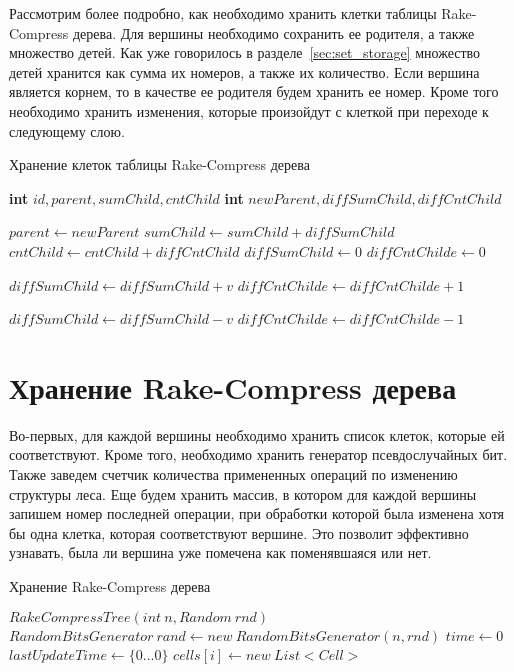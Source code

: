 Рассмотрим более подробно, как необходимо хранить клетки таблицы Rake-Compress дерева. 
Для вершины необходимо сохранить ее родителя, а также множество детей. 
Как уже говорилось в разделе~\ref{sec:set_storage} множество детей хранится как сумма их номеров, а также их количество.
Если вершина является корнем, то в качестве ее родителя будем хранить ее номер.
Кроме того необходимо хранить изменения, которые произойдут с клеткой при переходе к следующему слою.

\FloatBarrier
\begin{algorithm}
\caption{Хранение клеток таблицы Rake-Compress дерева}\label{algo:cell}
\begin{algorithmic}[1]
\State \textbf{int} $id, parent, sumChild, cntChild$
\State \textbf{int} $newParent, diffSumChild, diffCntChild$

\Statex
{}
	\State $parent \gets newParent$
	\State $sumChild \gets sumChild + diffSumChild$
	\State $cntChild \gets cntChild + diffCntChild$
	\State $diffSumChild \gets 0$
	\State $diffCntChilde \gets 0$
\EndProcedure

\Statex
{}
	\State $diffSumChild \gets diffSumChild + v$
	\State $diffCntChilde \gets diffCntChilde + 1$
\EndProcedure

\Statex
{}
	\State $diffSumChild \gets diffSumChild - v$
	\State $diffCntChilde \gets diffCntChilde - 1$
\EndProcedure

\end{algorithmic}
\end{algorithm}

\FloatBarrier
\section{Хранение Rake-Compress дерева}   

Во-первых, для каждой вершины необходимо хранить список клеток, которые ей соответствуют. 
Кроме того, необходимо хранить генератор псевдослучайных бит. 
Также заведем счетчик количества примененных операций по изменению структуры леса.
Еще будем хранить массив, в котором для каждой вершины запишем номер последней операции, 
при обработки которой была изменена хотя бы одна клетка, которая соответствуют вершине.
Это позволит эффективно узнавать, была ли вершина уже помечена как поменявшаяся или нет.

\FloatBarrier
\begin{algorithm}
\caption{Хранение Rake-Compress дерева}\label{algo:rc_tree_storage}
\begin{algorithmic}[1]
\State $RakeCompressTree(int \ n, Random \ rnd)$
\State $RandomBitsGenerator \ rand \gets new \ RandomBitsGenerator(n, rnd)$
\State $time \gets 0$
\State $lastUpdateTime \gets \{0 ... 0\}$
	\State $cells[i] \gets new \ List<Cell>$ 
\EndFor

\end{algorithmic}
\end{algorithm}


